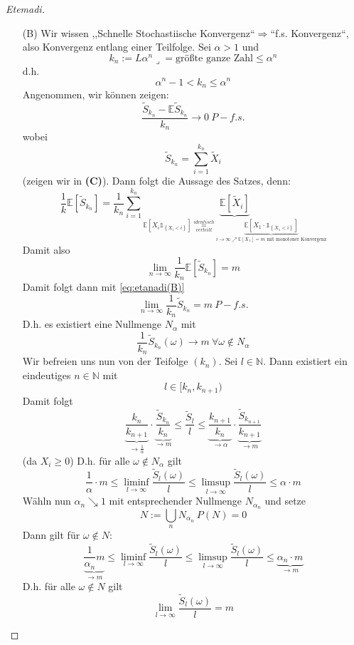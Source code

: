 \documentclass[10pt,a4paper]{report}
\numberwithin{equation}{section}
\numberwithin{figure}{section}
\theoremstyle{plain}
\theoremstyle{definition}
\theoremstyle{remark}
\theoremstyle{plain}
\newcommand{\1}{ \mathbb{1} } %
\begin{document}
\begin{proof}[Etemadi]
\begin{itemize}
  \item [{(B)}] Wir wissen ,,Schnelle
    Stochastiische Konvergenz``$\Rightarrow$``f.s. Konvergenz``, also
    Konvergenz entlang einer Teilfolge. Sei $\alpha>1$ und 
    \[
    k_{n}:=L\alpha^{n}\lrcorner=\text{größte ganze Zahl}\leq\alpha^{n}
    \]
    d.h.
    \[
    \alpha^{n}-1<k_{n}\leq\alpha^{n}
    \]
    Angenommen, wir können zeigen:
    \begin{equation}
      \frac{\tilde{S}_{k_{n}}-\mathbb{E}\tilde{S}_{k_{n}}}{k_{n}}\to0\ P-f.s.\label{eq:etanadi(B)}
    \end{equation}
    wobei
    \[
    \tilde{S}_{k_{n}}=\sum_{i=1}^{k_{n}}\tilde{X}_{i}
    \]
    (zeigen wir in \textbf{(C)}). Dann folgt die Aussage des Satzes, denn:
    \[
    \frac{1}{k}\mathbb{E}\left[\tilde{S}_{k_{n}}\right]=\frac{1}{k_{n}}\sum_{i=1}^{k_{n}}\underset{\mathbb{E}\left[X_{i}\1_{\left\{ X_{i}<i\right\} }\right]\overset{identisch}{\underset{verteilt}{=}}\underset{i\to\infty\nearrow\mathbb{E}\left[X_{1}\right]=m\text{ mit monotoner Konvergenz}}{\underbrace{\mathbb{E}\left[X_{1}\cdot\1_{\left\{ X_{1}<i\right\} }\right]}}}{\underbrace{\mathbb{E}\left[\tilde{X}_{i}\right]}}
    \]
    Damit also
    \[
    \lim_{n\to\infty}\frac{1}{k_{n}}\mathbb{E}\left[\tilde{S}_{k_{n}}\right]=m
    \]
    Damit folgt dann mit \ref{eq:etanadi(B)}
    \[
    \lim_{n\to\infty}\frac{1}{k_{n}}\tilde{S}_{k_{n}}=m\ P-f.s.
    \]
    D.h. es existiert eine Nullmenge $N_{\alpha}$ mit 
    \[
    \frac{1}{k_{n}}\tilde{S}_{k_{n}}\left(\omega\right)\to m\ \forall\omega\notin N_{\alpha}
    \]
    Wir befreien uns nun von der Teifolge $\left(k_{n}\right)$. Sei $l\in\mathbb{N}$.
    Dann existiert ein eindeutiges $n\in\mathbb{N}$ mit
    \[
    l\in[k_{n},k_{n+1})
    \]
    Damit folgt 
    \[
    \underset{\to\frac{1}{\alpha}}{\underbrace{\frac{k_{n}}{k_{n+1}}}}\cdot\underset{\to m}{\underbrace{\frac{\tilde{S}_{k_{n}}}{k_{n}}}}\leq\frac{\tilde{S}_{l}}{l}\leq\underset{\to\alpha}{\underbrace{\frac{k_{n+1}}{k_{n}}}}\cdot\underset{\to m}{\underbrace{\frac{\tilde{S}_{k_{n+1}}}{k_{n+1}}}}
    \]
    (da $X_{i}\geq0$) D.h. für alle $\omega\notin N_{\alpha}$ gilt
    \[
    \frac{1}{\alpha}\cdot m\leq\liminf_{l\to\infty}\frac{\tilde{S}_{l}\left(\omega\right)}{l}\leq\limsup_{l\to\infty}\frac{\tilde{S}_{l}\left(\omega\right)}{l}\leq\alpha\cdot m
    \]
    Wähln nun $\alpha_{n}\searrow1$ mit entsprechender Nullmenge $N_{\alpha_{n}}$
    und setze
    \[
    N:=\bigcup_{n}N_{\alpha_{n}}\ P\left(N\right)=0
    \]
    Dann gilt für $\omega\notin N$:
    \[
    \underset{\to m}{\underbrace{\frac{1}{\alpha_{n}}m}}\leq\liminf_{l\to\infty}\frac{\tilde{S}_{l}\left(\omega\right)}{l}\leq\limsup_{l\to\infty}\frac{\tilde{S}_{l}\left(\omega\right)}{l}\leq\underset{\to m}{\underbrace{\alpha_{n}\cdot m}}
    \]
    D.h. für alle $\omega\notin N$ gilt
    \[
    \lim_{l\to\infty}\frac{\tilde{S}_{l}\left(\omega\right)}{l}=m
    \]


\end{itemize}
\end{proof}
\end{document}

